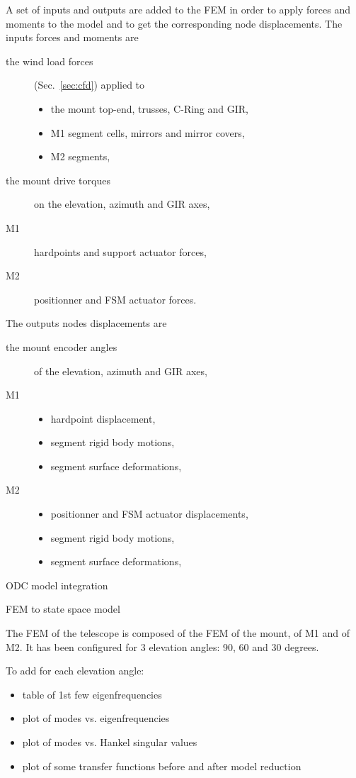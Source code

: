 \documentclass{gmto}
\begin{document}
A set of inputs and outputs are added to the FEM in order to apply
forces and moments to the model and to get the corresponding node displacements.
The inputs forces and moments are
\begin{description}
\item[the wind load forces](Sec.~\ref{sec:cfd}) applied to
  \begin{itemize}
  \item   the mount top-end, trusses, C-Ring and GIR,
  \item  M1 segment cells, mirrors and mirror covers,
  \item  M2 segments,
  \end{itemize}
\item[the mount drive torques] on the elevation, azimuth and GIR axes,
\item[M1] hardpoints and support actuator forces,
\item[M2] positionner and FSM actuator forces.
\end{description}
The outputs nodes displacements are
\begin{description}
\item[the mount encoder angles] of the elevation, azimuth and GIR axes,
\item[M1]
  \begin{itemize}
  \item hardpoint displacement,
  \item segment rigid body motions,
  \item segment surface deformations,
  \end{itemize}
\item[M2]
  \begin{itemize}
  \item positionner and FSM actuator displacements,
  \item segment rigid body motions,
  \item segment surface deformations,
  \end{itemize}
\end{description}

ODC model integration\cite{mount_pdr_iv}

FEM to state space model\cite{ss2fem_Christoph2020}

The FEM of the telescope is composed of the FEM of the mount, of M1 and of M2.
It has been configured for 3 elevation angles: 90, 60 and 30 degrees.

To add for each elevation angle:
\begin{itemize}
\item table of 1st few eigenfrequencies
\item plot of modes vs. eigenfrequencies
\item plot of modes vs. Hankel  singular values
\item plot of some transfer functions before and after model reduction
\end{itemize}
\end{document}
